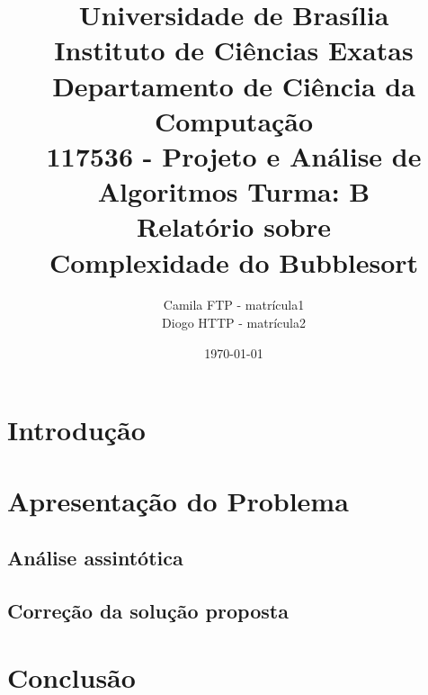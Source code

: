 \documentclass[12pt]{article}
\title{{\large Universidade de Brasília \\ Instituto de Ciências Exatas \\
Departamento de Ciência da Computação} \\[1cm]
117536 - Projeto e Análise de Algoritmos Turma: B\\[.5cm]
Relatório sobre {\\ \bf Complexidade do Bubblesort}}
\author{Camila FTP - matrícula1 \\
        Diogo HTTP - matrícula2}
\date{\today}
\begin{document}
\maketitle

\section{Introdução}

\section{Apresentação do Problema}

\subsection{Análise assintótica}

\subsection{Correção da solução proposta}

\section{Conclusão}
\end{document}
